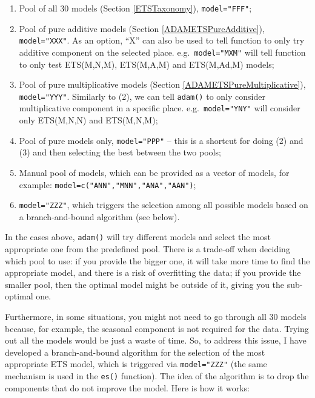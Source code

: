 \documentclass[]{book}
\providecommand{\tightlist}{%
  \setlength{\itemsep}{0pt}\setlength{\parskip}{0pt}}
\theoremstyle{definition}
\theoremstyle{definition}
\theoremstyle{definition}
\theoremstyle{definition}
\theoremstyle{remark}
\begin{document}
\begin{enumerate}
\def\labelenumi{\arabic{enumi}.}
\tightlist
\item
  Pool of all 30 models (Section \ref{ETSTaxonomy}), \texttt{model="FFF"};
\item
  Pool of pure additive models (Section \ref{ADAMETSPureAdditive}), \texttt{model="XXX"}. As an option, ``X'' can also be used to tell function to only try additive component on the selected place. e.g.~\texttt{model="MXM"} will tell function to only test ETS(M,N,M), ETS(M,A,M) and ETS(M,Ad,M) models;
\item
  Pool of pure multiplicative models (Section \ref{ADAMETSPureMultiplicative}), \texttt{model="YYY"}. Similarly to (2), we can tell \texttt{adam()} to only consider multiplicative component in a specific place. e.g.~\texttt{model="YNY"} will consider only ETS(M,N,N) and ETS(M,N,M);
\item
  Pool of pure models only, \texttt{model="PPP"} -- this is a shortcut for doing (2) and (3) and then selecting the best between the two pools;
\item
  Manual pool of models, which can be provided as a vector of models, for example: \texttt{model=c("ANN","MNN","ANA","AAN")};
\item
  \texttt{model="ZZZ"}, which triggers the selection among all possible models based on a branch-and-bound algorithm (see below).
\end{enumerate}

In the cases above, \texttt{adam()} will try different models and select the most appropriate one from the predefined pool. There is a trade-off when deciding which pool to use: if you provide the bigger one, it will take more time to find the appropriate model, and there is a risk of overfitting the data; if you provide the smaller pool, then the optimal model might be outside of it, giving you the sub-optimal one.

Furthermore, in some situations, you might not need to go through all 30 models because, for example, the seasonal component is not required for the data. Trying out all the models would be just a waste of time. So, to address this issue, I have developed a branch-and-bound algorithm for the selection of the most appropriate ETS model, which is triggered via \texttt{model="ZZZ"} (the same mechanism is used in the \texttt{es()} function). The idea of the algorithm is to drop the components that do not improve the model. Here is how it works:
\end{document}
